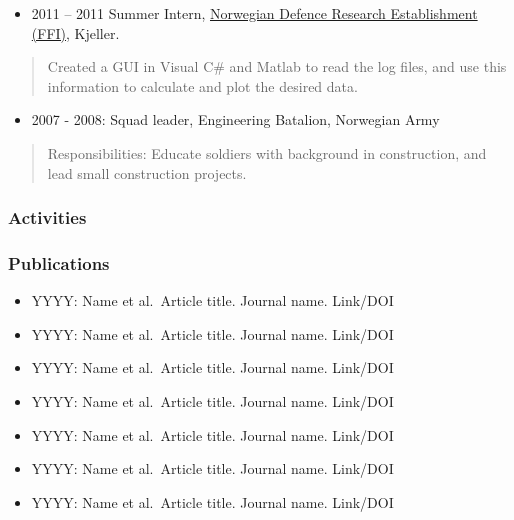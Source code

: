 \documentclass[11pt, a4paper]{article}
\providecommand{\tightlist}{%
  \setlength{\itemsep}{0pt}\setlength{\parskip}{0pt}}
\begin{document}
\begin{raggedright}
\begin{itemize}
\tightlist
\item
  2011 -- 2011 Summer Intern, \href{https://www.ffi.no}{Norwegian
  Defence Research Establishment (FFI)}, Kjeller.
\end{itemize}

\begin{quote}
Created a GUI in Visual C\# and Matlab to read the log files, and use
this information to calculate and plot the desired data.
\end{quote}

\begin{itemize}
\tightlist
\item
  2007 - 2008: Squad leader, Engineering Batalion, Norwegian Army
\end{itemize}

\begin{quote}
Responsibilities: Educate soldiers with background in construction, and
lead small construction projects.
\end{quote}

\hypertarget{activities}{%
\subsubsection{Activities}\label{activities}}

\newpage

\hypertarget{publications}{%
\subsubsection{Publications}\label{publications}}

\begin{itemize}
\tightlist
\item
  YYYY: Name et al.~Article title. Journal name. Link/DOI
\item
  YYYY: Name et al.~Article title. Journal name. Link/DOI
\item
  YYYY: Name et al.~Article title. Journal name. Link/DOI
\item
  YYYY: Name et al.~Article title. Journal name. Link/DOI
\item
  YYYY: Name et al.~Article title. Journal name. Link/DOI
\item
  YYYY: Name et al.~Article title. Journal name. Link/DOI
\item
  YYYY: Name et al.~Article title. Journal name. Link/DOI
\end{itemize}


\end{raggedright}
\end{document}
